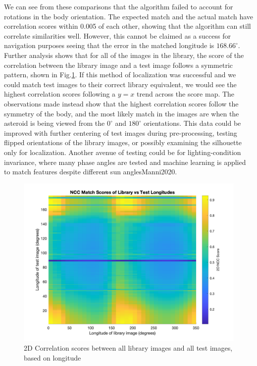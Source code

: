 We can see from these comparisons that the algorithm failed to account for rotations in the body orientation. The expected match and the actual match have correlation scores within 0.005 of each other, showing that the algorithm can still correlate similarities well. However, this cannot be claimed as a success for navigation purposes seeing that the error in the matched longitude is $168.66^{\circ}$. Further analysis shows that for all of the images in the library, the score of the correlation between the library image and a test image follows a symmetric pattern, shown in Fig.\ref{fig:heatmap}. If this method of localization was successful and we could match test images to their correct library equivalent, we would see the highest correlation scores following a $y=x$ trend across the score map. The observations made instead show that the highest correlation scores follow the symmetry of the body, and the most likely match in the images are when the asteroid is being viewed from the $0^{\circ}$ and $180^{\circ}$ orientations. This data could be improved with further centering of test images during pre-processing, testing flipped orientations of the library images, or possibly examining the silhouette only for localization. Another avenue of testing could be for lighting-condition invariance, where many phase angles are tested and machine learning is applied to match features despite different sun angles{Manni2020}. 

\begin{figure}[H]
    \centering
    \includegraphics[width= 1.1\textwidth]{fig/all_scores.png}
    \caption{2D Correlation scores between all library images and all test images, based on longitude}
    \label{fig:heatmap}
\end{figure}

